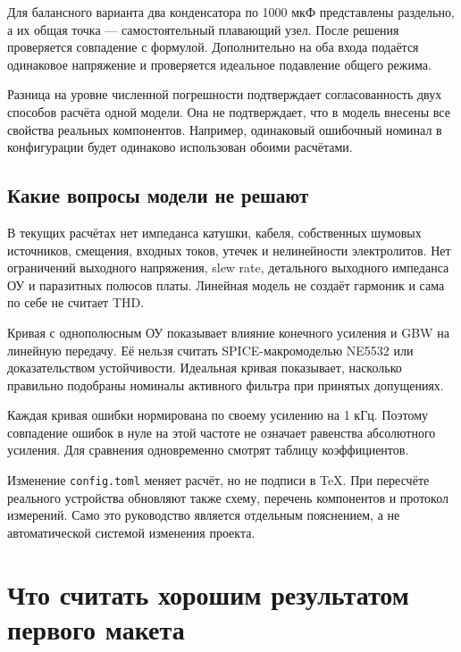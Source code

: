 \documentclass[a4paper,11pt]{article}
\newcommand{\file}[1]{\nolinkurl{#1}}
\begin{document}
Для балансного варианта два конденсатора по 1000 мкФ представлены раздельно,
а их общая точка — самостоятельный плавающий узел.
После решения проверяется совпадение с формулой. Дополнительно на оба входа
подаётся одинаковое напряжение и проверяется идеальное подавление общего режима.

Разница на уровне численной погрешности подтверждает согласованность двух
способов расчёта одной модели. Она не подтверждает, что в модель внесены
все свойства реальных компонентов. Например, одинаковый ошибочный номинал
в конфигурации будет одинаково использован обоими расчётами.

\subsection{Какие вопросы модели не решают}

В текущих расчётах нет импеданса катушки, кабеля, собственных шумовых источников,
смещения, входных токов, утечек и нелинейности электролитов. Нет ограничений
выходного напряжения, slew rate, детального выходного импеданса ОУ и паразитных
полюсов платы. Линейная модель не создаёт гармоник и сама по себе не считает THD.

Кривая с однополюсным ОУ показывает влияние конечного усиления и GBW на
линейную передачу. Её нельзя считать SPICE-макромоделью NE5532 или доказательством
устойчивости. Идеальная кривая показывает, насколько правильно подобраны
номиналы активного фильтра при принятых допущениях.

Каждая кривая ошибки нормирована по своему усилению на 1 кГц.
Поэтому совпадение ошибок в нуле на этой частоте не означает равенства
абсолютного усиления. Для сравнения одновременно смотрят таблицу коэффициентов.

Изменение \file{config.toml} меняет расчёт, но не подписи в TeX.
При пересчёте реального устройства обновляют также схему, перечень компонентов
и протокол измерений. Само это руководство является отдельным пояснением,
а не автоматической системой изменения проекта.

\section{Что считать хорошим результатом первого макета}
\end{document}
